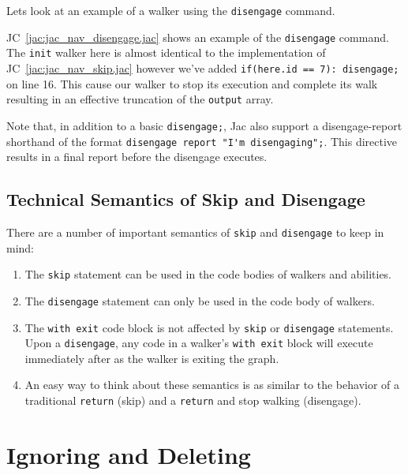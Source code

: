 \par
Lets look at an example of a walker using the \lstinline{disengage} command.
\par
{}
\par
{}


JC~\ref{jac:jac_nav_disengage.jac} shows an example of the \lstinline{disengage} command. The \lstinline{init} walker here is almost identical to the implementation of JC~\ref{jac:jac_nav_skip.jac} however we've added \lstinline{if(here.id == 7): disengage;} on line 16. This cause our walker to stop its execution and complete its walk resulting in an effective truncation of the \lstinline{output} array.
\par
Note that, in addition to a basic \lstinline{disengage;}, Jac also support a disengage-report shorthand of the format \lstinline{disengage report "I'm disengaging";}. This directive results in a final report before the disengage executes.

\subsection{Technical Semantics of Skip and Disengage}
\par
There are a number of important semantics of \lstinline{skip} and \lstinline{disengage} to keep in mind:
\begin{enumerate}
    \item The \lstinline{skip} statement can be used in the code bodies of walkers and abilities.
    \item The \lstinline{disengage} statement can only be used in the code body of walkers.
    \item The \lstinline{with exit} code block is not affected by \lstinline{skip} or \lstinline{disengage} statements. Upon a \lstinline{disengage}, any code in a walker's \lstinline{with exit} block will execute immediately after as the walker is exiting the graph.
    \item An easy way to think about these semantics is as similar to the behavior of a traditional \lstinline{return} (skip) and a \lstinline{return} and stop walking (disengage).
\end{enumerate}

\section{Ignoring and Deleting}

